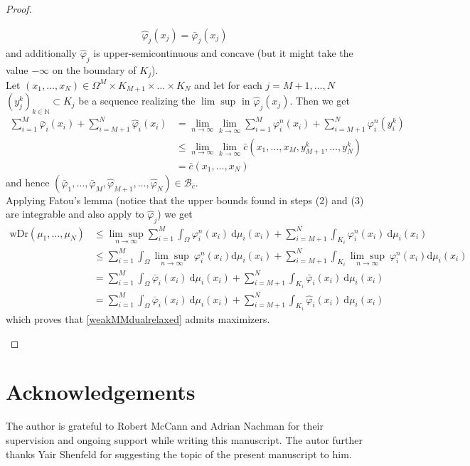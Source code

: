 \documentclass[letterpaper]{amsart}
\newcommand{\NN}{\mathbb{N}}
\newcommand{\dd}{\mathrm{d}}
\theoremstyle{definition}
\begin{document}
\begin{proof}
\begin{enumerate}
\begin{gather*}
		\hat\varphi_j(x_j)=\bar\varphi_j(x_j)
	\end{gather*}
	and additionally $\hat\varphi_j$ is upper-semicontinuous and concave (but it might take the value $-\infty$ on the boundary of $K_j$).\\
	Let $(x_1,\dots,x_N)\in\Omega^M\times K_{M+1}\times\dots\times K_N$ and let for each $j=M+1,\dots,N$ $(y_j^k)_{k\in\NN}\subset K_j$ be a sequence realizing the $\lim\sup$ in $\hat\varphi_j(x_j)$.
	Then we get
	\begin{align*}
		\sum_{i=1}^M\bar\varphi_i(x_i)+\sum_{i=M+1}^N\hat\varphi_i(x_i)&=\lim_{n\rightarrow\infty}\lim_{k\rightarrow\infty}\sum_{i=1}^M\varphi_i^n(x_i)+\sum_{i=M+1}^N\varphi_i^n(y_i^k)\\
		&\leq \lim_{n\rightarrow\infty}\lim_{k\rightarrow\infty}\bar c(x_1,\dots,x_M,y_{M+1}^k,\dots,y_{N}^k)\\
		&=\bar c(x_1,\dots,x_N)
	\end{align*}
	and hence $(\bar\varphi_1,\dots,\bar\varphi_M,\hat\varphi_{M+1},\dots,\hat\varphi_{N})\in\mathcal B_{\bar c}$.\\
	Applying Fatou's lemma (notice that the upper bounds found in steps (2) and (3) are integrable and also apply to $\hat\varphi_j$) we get
	\begin{align*}
		\text{wDr}(\mu_1,\dots,\mu_N)
		&\leq\underset{n\rightarrow\infty}{\lim\sup}\sum_{i=1}^M\int_\Omega\varphi_i^n(x_i)\ \dd\mu_i(x_i)+\sum_{i=M+1}^N\int_{K_i}\varphi_i^n(x_i)\ \dd\mu_i(x_i)\\
		&\leq\sum_{i=1}^M\int_\Omega\underset{n\rightarrow\infty}{\lim\sup}\ \varphi_i^n(x_i) \dd\mu_i(x_i)+\sum_{i=M+1}^N\int_{K_i}\underset{n\rightarrow\infty}{\lim\sup}\ \varphi_i^n(x_i) \dd\mu_i(x_i)\\
		&=\sum_{i=1}^M\int_\Omega\bar\varphi_i(x_i)\ \dd\mu_i(x_i)+\sum_{i=M+1}^N\int_{K_i}\bar\varphi_i(x_i)\ \dd\mu_i(x_i)\\
		&=\sum_{i=1}^M\int_\Omega\bar\varphi_i(x_i)\ \dd\mu_i(x_i)+\sum_{i=M+1}^N\int_{K_i}\hat\varphi_i(x_i)\ \dd\mu_i(x_i)
	\end{align*}
	which proves that \eqref{weakMMdualrelaxed} admits maximizers.
	\end{enumerate}
\end{proof}

\section*{Acknowledgements}
The author is grateful to Robert McCann and Adrian Nachman for their supervision and ongoing support while writing this manuscript. The autor further thanks Yair Shenfeld for suggesting the topic of the present manuscript to him.
\end{document}
